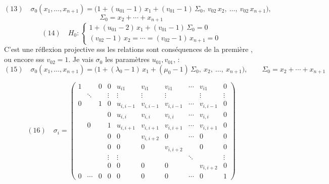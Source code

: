 \documentclass[11pt,a4paper]{article}
\begin{document}
\[
(13)\quad \sigma_0(x_1,\dots,x_{n+1}) = \bigl(1 + (u_{01}-1)\,x_1 + (v_{01}-1)\,\Sigma_0,\ v_{02}\,x_2,\ \dots,\ v_{02}\,x_{n+1}\bigr),
\]
\[
\Sigma_0 = x_2 + \cdots + x_{n+1}
\]
\[
(14)\quad H_0 : \begin{cases}
1 + (u_{01}-2)\,x_1 + (v_{01}-1)\,\Sigma_0 = 0\\
(v_{02}-1)\,x_2 = \cdots = (v_{02}-1)\,x_{n+1} = 0
\end{cases}
\]
C'est une réflexion projective sss les  relations sont conséquences de la première , ou encore sss $\boxed{v_{02} = 1}$. Je vais  \ill{} $\sigma_0$ les paramètres  $u_{01}, v_{01}$, \ill{}  :
\[
(15)\quad \sigma_0(x_1,\dots,x_{n+1}) = \bigl(1 + (\lambda_0-1)\,x_1 + (\mu_0-1)\,\Sigma_0,\ x_2,\ \dots,\ x_{n+1}\bigr),
\qquad \Sigma_0 = x_2+\cdots+x_{n+1}
\]

\[
(16)\quad \sigma_i =
\left(\begin{array}{ccc|c|ccccc|c}
1 & & 0 & 0 & u_{i1} & v_{i1} & v_{i1} & \cdots & v_{i1} & 0\\
 & \ddots & & \vdots & \vdots & \vdots & \vdots & & \vdots & \vdots\\
0 & & 1 & 0 & u_{i,i-1} & v_{i,i-1} & v_{i,i-1} & \cdots & v_{i,i-1} & 0\\
 & & & 0 & u_{i,i} & v_{i,i} & v_{i,i} & \cdots & v_{i,i} & 0\\
 & 0 & & 1 & u_{i,i+1} & v_{i,i+1} & v_{i,i+1} & \cdots & v_{i,i+1} & 0\\
 & & & 0 & 0 & v_{i,i+2} & 0 & \cdots & 0 & 0\\
 & & & 0 & 0 & 0 & v_{i,i+2} & & 0 & 0\\
 & & & \vdots & \vdots & & & \ddots & & \vdots\\
 & & & 0 & 0 & 0 & 0 & & v_{i,i+2} & 0\\
\hline
0 & \cdots & 0 & 0 & 0 & 0 & 0 & \cdots & 0 & 1
\end{array}\right)
\]
\end{document}
